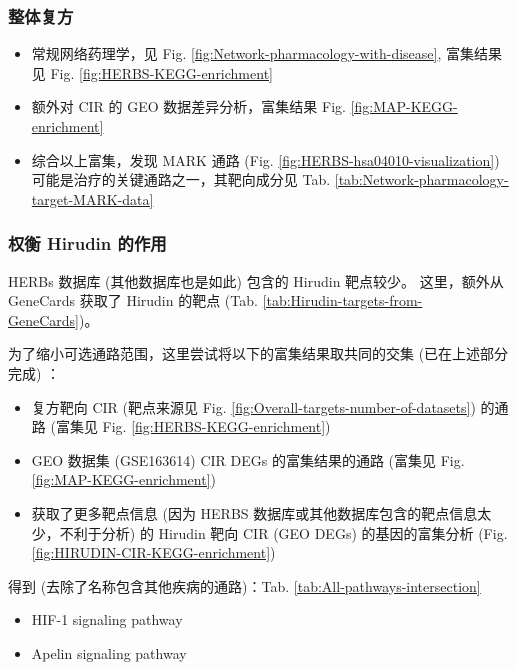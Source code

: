 \documentclass[
]{article}
\providecommand{\tightlist}{%
  \setlength{\itemsep}{0pt}\setlength{\parskip}{0pt}}
\begin{document}
\hypertarget{ux6574ux4f53ux590dux65b9}{%
\subsubsection{整体复方}\label{ux6574ux4f53ux590dux65b9}}

\begin{itemize}
\tightlist
\item
  常规网络药理学，见 Fig. \ref{fig:Network-pharmacology-with-disease}, 富集结果见 Fig. \ref{fig:HERBS-KEGG-enrichment}
\item
  额外对 CIR 的 GEO 数据差异分析，富集结果 Fig. \ref{fig:MAP-KEGG-enrichment}
\item
  综合以上富集，发现 MARK 通路 (Fig. \ref{fig:HERBS-hsa04010-visualization}) 可能是治疗的关键通路之一，其靶向成分见 Tab. \ref{tab:Network-pharmacology-target-MARK-data}
\end{itemize}

\hypertarget{ux6743ux8861-hirudin-ux7684ux4f5cux7528}{%
\subsubsection{权衡 Hirudin 的作用}\label{ux6743ux8861-hirudin-ux7684ux4f5cux7528}}

HERBs 数据库 (其他数据库也是如此) 包含的 Hirudin 靶点较少。
这里，额外从 GeneCards 获取了 Hirudin 的靶点 (Tab. \ref{tab:Hirudin-targets-from-GeneCards})。

为了缩小可选通路范围，这里尝试将以下的富集结果取共同的交集 (已在上述部分完成) ：

\begin{itemize}
\tightlist
\item
  复方靶向 CIR (靶点来源见 Fig. \ref{fig:Overall-targets-number-of-datasets}) 的通路
  (富集见 Fig. \ref{fig:HERBS-KEGG-enrichment})
\item
  GEO 数据集 (GSE163614) CIR DEGs 的富集结果的通路 (富集见 Fig. \ref{fig:MAP-KEGG-enrichment})
\item
  获取了更多靶点信息 (因为 HERBS 数据库或其他数据库包含的靶点信息太少，不利于分析) 的 Hirudin 靶向 CIR (GEO DEGs) 的基因的富集分析 (Fig. \ref{fig:HIRUDIN-CIR-KEGG-enrichment})
\end{itemize}

得到 (去除了名称包含其他疾病的通路)：Tab. \ref{tab:All-pathways-intersection}

\begin{itemize}
\tightlist
\item
  HIF-1 signaling pathway
\item
  Apelin signaling pathway
\end{itemize}
\end{document}
